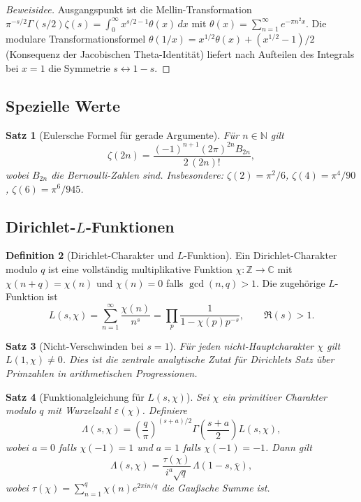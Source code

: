 \documentclass[12pt,a4paper]{amsart}
\newtheorem{theorem}{Satz}[section]
\theoremstyle{definition}
\newtheorem{definition}[theorem]{Definition}
\begin{document}
\begin{proof}[Beweisidee]
Ausgangspunkt ist die Mellin-Transformation \(\pi^{-s/2}\Gamma(s/2)\zeta(s)
= \int_0^\infty x^{s/2-1}\theta(x)\,dx\) mit
\(\theta(x) = \sum_{n=1}^\infty e^{-\pi n^2 x}\).
Die modulare Transformationsformel
\(\theta(1/x) = x^{1/2}\theta(x) + (x^{1/2}-1)/2\)
(Konsequenz der Jacobischen Theta-Identität) liefert nach Aufteilen des Integrals
bei \(x = 1\) die Symmetrie \(s \leftrightarrow 1-s\).
\end{proof}

\subsection{Spezielle Werte}

\begin{theorem}[Eulersche Formel für gerade Argumente]
Für \(n \in \mathbb{N}\) gilt
\[
  \zeta(2n) = \frac{(-1)^{n+1}(2\pi)^{2n}B_{2n}}{2\,(2n)!},
\]
wobei \(B_{2n}\) die Bernoulli-Zahlen sind.  Insbesondere:
\(\zeta(2) = \pi^2/6\), \(\zeta(4) = \pi^4/90\), \(\zeta(6) = \pi^6/945\).
\end{theorem}

\subsection{Dirichlet-\(L\)-Funktionen}

\begin{definition}[Dirichlet-Charakter und \(L\)-Funktion]
Ein Dirichlet-Charakter modulo \(q\) ist eine vollständig multiplikative Funktion
\(\chi: \mathbb{Z} \to \mathbb{C}\) mit \(\chi(n+q) = \chi(n)\) und \(\chi(n) = 0\)
falls \(\gcd(n,q) > 1\).  Die zugehörige \(L\)-Funktion ist
\[
  L(s,\chi) = \sum_{n=1}^\infty \frac{\chi(n)}{n^s}
  = \prod_p \frac{1}{1-\chi(p)p^{-s}}, \qquad \Re(s) > 1.
\]
\end{definition}

\begin{theorem}[Nicht-Verschwinden bei \(s=1\)]
Für jeden nicht-Hauptcharakter \(\chi\) gilt \(L(1,\chi) \neq 0\).
Dies ist die zentrale analytische Zutat für Dirichlets Satz über Primzahlen in
arithmetischen Progressionen.
\end{theorem}

\begin{theorem}[Funktionalgleichung für \(L(s,\chi)\)]
Sei \(\chi\) ein primitiver Charakter modulo \(q\) mit Wurzelzahl \(\varepsilon(\chi)\).
Definiere
\[
  \Lambda(s,\chi) = \left(\frac{q}{\pi}\right)^{(s+a)/2}\!\Gamma\!\left(\frac{s+a}{2}\right)L(s,\chi),
\]
wobei \(a = 0\) falls \(\chi(-1) = 1\) und \(a = 1\) falls \(\chi(-1) = -1\).  Dann gilt
\[
  \Lambda(s,\chi) = \frac{\tau(\chi)}{i^a\sqrt{q}}\,\Lambda(1-s,\bar\chi),
\]
wobei \(\tau(\chi) = \sum_{n=1}^q \chi(n)e^{2\pi in/q}\) die Gaußsche Summe ist.
\end{theorem}
\end{document}
